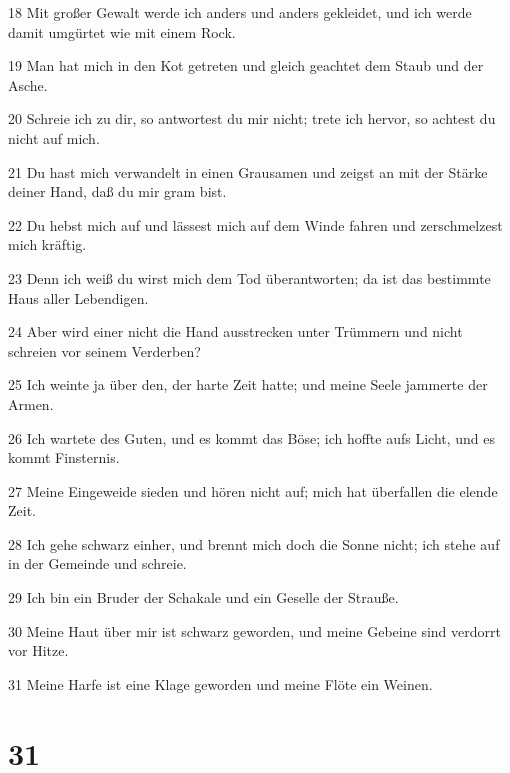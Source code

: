 \par 18 Mit großer Gewalt werde ich anders und anders gekleidet, und ich werde damit umgürtet wie mit einem Rock.
\par 19 Man hat mich in den Kot getreten und gleich geachtet dem Staub und der Asche.
\par 20 Schreie ich zu dir, so antwortest du mir nicht; trete ich hervor, so achtest du nicht auf mich.
\par 21 Du hast mich verwandelt in einen Grausamen und zeigst an mit der Stärke deiner Hand, daß du mir gram bist.
\par 22 Du hebst mich auf und lässest mich auf dem Winde fahren und zerschmelzest mich kräftig.
\par 23 Denn ich weiß du wirst mich dem Tod überantworten; da ist das bestimmte Haus aller Lebendigen.
\par 24 Aber wird einer nicht die Hand ausstrecken unter Trümmern und nicht schreien vor seinem Verderben?
\par 25 Ich weinte ja über den, der harte Zeit hatte; und meine Seele jammerte der Armen.
\par 26 Ich wartete des Guten, und es kommt das Böse; ich hoffte aufs Licht, und es kommt Finsternis.
\par 27 Meine Eingeweide sieden und hören nicht auf; mich hat überfallen die elende Zeit.
\par 28 Ich gehe schwarz einher, und brennt mich doch die Sonne nicht; ich stehe auf in der Gemeinde und schreie.
\par 29 Ich bin ein Bruder der Schakale und ein Geselle der Strauße.
\par 30 Meine Haut über mir ist schwarz geworden, und meine Gebeine sind verdorrt vor Hitze.
\par 31 Meine Harfe ist eine Klage geworden und meine Flöte ein Weinen.

\chapter{31}

